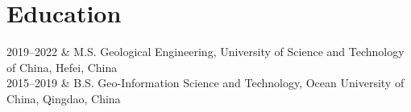 \section{Education}

\begin{EntriesTable}{0.18}{0.02}{0.80}
2019--2022 & M.S. Geological Engineering, University of Science and Technology of China, Hefei, China \\
2015--2019 & B.S. Geo-Information Science and Technology, Ocean University of China, Qingdao, China \\
\end{EntriesTable}
